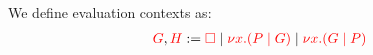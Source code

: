 \begin{definition}\label{def:cp-evaluation-contexts}
  We define evaluation contexts as:
  \begin{align*}
    \textcolor{red}{G}, \textcolor{red}{H} := \textcolor{red}{\Box} \mid \textcolor{red}{\nu x.(P \mid G)} \mid \textcolor{red}{\nu x.(G \mid P)}
  \end{align*}
\end{definition}
